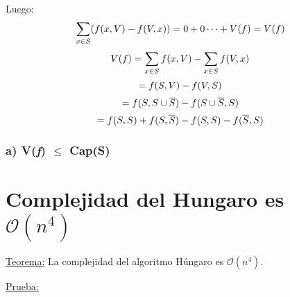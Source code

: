\documentclass[12pt,a4paper]{report}
\begin{document}
		Luego:
		\begin{equation}
			\sum_{x \in S}(f(x, V) - f(V, x)) = 0 + 0 \dotsb + V(f) = V(f) \\
		\end{equation}
		\begin{equation}
			\vspace{5mm} \\
			V(f) = \sum_{x \in S}f(x, V) - \sum_{x \in S}f(V, x) \\
		\end{equation}
		\begin{equation}
			= f(S, V) - f(V, S) \\
		\end{equation}
        \begin{equation}
           = f(S, S \cup \overline{S}) - f(S \cup \overline{S}, S) \\
        \end{equation}
		\begin{equation}
			= f(S, S) + f(S, \overline{S}) - f(S, S) -  f(\overline{S}, S) \\
		\end{equation}
				
		\subsubsection{a) V(\textit{f}) $\leq$ Cap(S)}
			
		
		
		
		
		
	\section{Complejidad del Hungaro es $\mathcal{O}(n^{4})$}
	
		\underline{Teorema:} La complejidad del algoritmo Húngaro es $\mathcal{O}(n^{4})$.
		
		\underline{Prueba:} 
		
\end{document}
